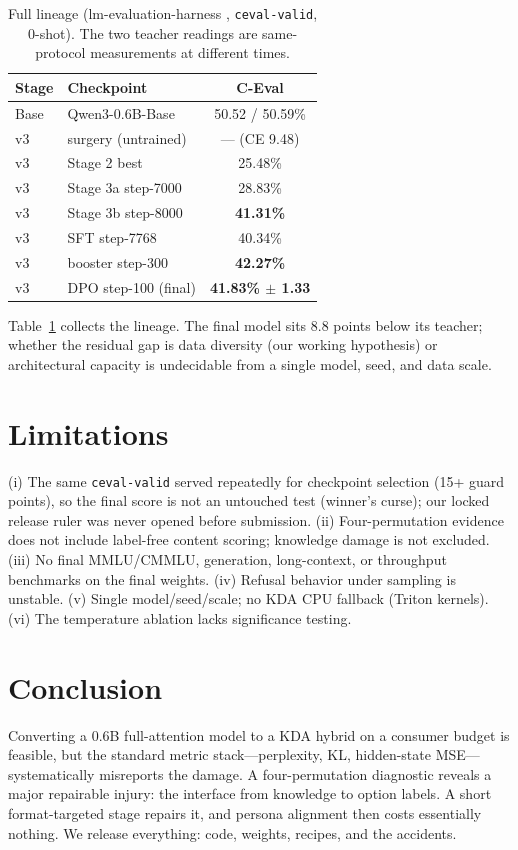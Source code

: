 \documentclass[11pt]{article}
\begin{document}
\begin{table}[t]
\centering
\small
\begin{tabular}{@{}llc@{}}
\toprule
Stage & Checkpoint & C-Eval \\
\midrule
Base & Qwen3-0.6B-Base & 50.52 / 50.59\% \\
v3 & surgery (untrained) & --- (CE 9.48) \\
v3 & Stage 2 best & 25.48\% \\
v3 & Stage 3a step-7000 & 28.83\% \\
v3 & Stage 3b step-8000 & \textbf{41.31\%} \\
v3 & SFT step-7768 & 40.34\% \\
v3 & booster step-300 & \textbf{42.27\%} \\
v3 & DPO step-100 (final) & \textbf{41.83\% $\pm$ 1.33} \\
\bottomrule
\end{tabular}
\caption{Full lineage (lm-evaluation-harness \citep{eval-harness},
\texttt{ceval-valid}, 0-shot). The two teacher readings are
same-protocol measurements at different times.}
\label{tab:lineage}
\end{table}

Table~\ref{tab:lineage} collects the lineage. The final model sits
8.8 points below its teacher; whether the residual gap is data diversity
(our working hypothesis) or architectural capacity is undecidable from a
single model, seed, and data scale.

\section{Limitations}
\label{sec:limits}

(i) The same \texttt{ceval-valid} served repeatedly for checkpoint
selection (15+ guard points), so the final score is not an untouched
test (winner's curse); our locked release ruler was never opened before
submission. (ii) Four-permutation evidence does not include label-free
content scoring; knowledge damage is not excluded. (iii) No final
MMLU/CMMLU, generation, long-context, or throughput benchmarks on the
final weights. (iv) Refusal behavior under sampling is unstable.
(v) Single model/seed/scale; no KDA CPU fallback (Triton kernels).
(vi) The temperature ablation lacks significance testing.

\section{Conclusion}

Converting a 0.6B full-attention model to a KDA hybrid on a consumer
budget is feasible, but the standard metric stack---perplexity, KL,
hidden-state MSE---systematically misreports the damage. A
four-permutation diagnostic reveals a major repairable injury: the
interface from knowledge to option labels. A short format-targeted
stage repairs it, and persona alignment then costs essentially nothing.
We release everything: code, weights, recipes, and the accidents.


\end{document}
